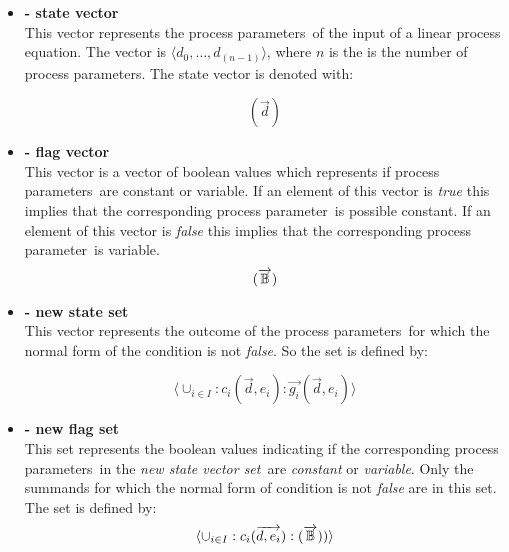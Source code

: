 \documentclass[a4paper,10pt]{article}
\newcommand{\lpe}{linear process equation}
\newcommand{\ovr}{\overrightarrow}
\newcommand{\pp}{process parameter}
\newcommand{\pps}{process parameters}
\newcommand{\ti}{\textit}
\newcommand{\svs}{\textit{new state vector set}}
\begin{document}
\begin{itemize}
\item \begin{defn} \textbf{- state vector}\\
This vector represents the \pps\ of the input of a \lpe . The vector is 
$\langle d_0, \ldots, d_(n-1) \rangle$, where $n$ is the is the number
of \pps . The state vector is denoted with: 

\begin{displaymath}
(\ovr{d})
\end{displaymath}
\end{defn}

\item \begin{defn} \textbf{- flag vector}\\
This vector is a vector of boolean values which represents if \pps\
are constant or variable. If an element of this vector is \ti{true}
this implies that the corresponding \pp\ is possible constant. If an element
of this vector is \ti{false} this implies that the corresponding
\pp\ is variable.
\begin{displaymath}
(\ovr{\Bbb{B}})
\end{displaymath}
\end{defn}

\item \begin{defn} \textbf{- new state set}\\
 This vector represents the outcome of the
\pps\ for which the normal form of the condition is not \ti{false}. So
the set is defined by:

\begin{displaymath}\langle \cup_{i \in I}: c_i(\ovr{d},
e_i) :\ovr{g_i}(\ovr{d},e_i) \rangle
\end{displaymath}
\end{defn}

\item \begin{defn}
\textbf{- new flag set} \\
This set represents the boolean values indicating if the
corresponding \pps\ in the \svs\ are \ti{constant} or \ti{variable}. Only the summands for
which the normal form of condition is not \ti{false} are in this set. The set is
defined by:
\begin{displaymath}
\langle \cup_{i \in I}: c_i(\ovr{d, e_i}) : (\ovr{\Bbb{B}}) ) \rangle
\end{displaymath}
\end{defn}
\end{itemize}
\end{document}
